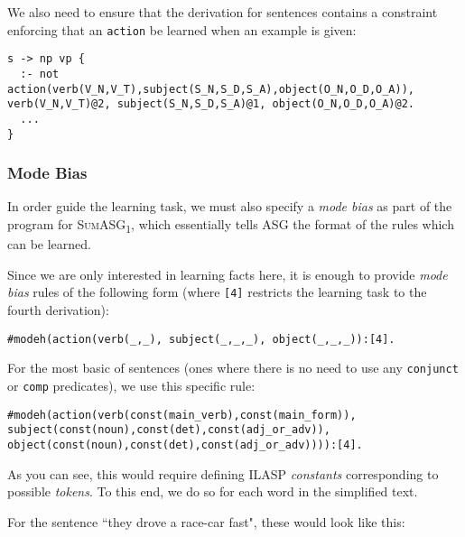 We also need to ensure that the derivation for sentences contains a constraint enforcing that an \texttt{action} be learned when an example is given:

\begin{displayquote}
\begin{lstlisting}[numbers=none]
s -> np vp {
  :- not action(verb(V_N,V_T),subject(S_N,S_D,S_A),object(O_N,O_D,O_A)), verb(V_N,V_T)@2, subject(S_N,S_D,S_A)@1, object(O_N,O_D,O_A)@2.
  ...
}
\end{lstlisting}
\end{displayquote}

\subsubsection{Mode Bias}

In order guide the learning task, we must also specify a \textit{mode bias} as part of the program for \textsc{SumASG\textsubscript{1}}, which essentially tells ASG the format of the rules which can be learned.

Since we are only interested in learning facts here, it is enough to provide \textit{mode bias} rules of the following form (where \texttt{[4]} restricts the learning task to the fourth derivation):

\begin{displayquote}
\begin{lstlisting}[numbers=none]
#modeh(action(verb(_,_), subject(_,_,_), object(_,_,_)):[4].
\end{lstlisting}
\end{displayquote}

For the most basic of sentences (ones where there is no need to use any \texttt{conjunct} or \texttt{comp} predicates), we use this specific rule:

\begin{displayquote}
\begin{lstlisting}[numbers=none]
#modeh(action(verb(const(main_verb),const(main_form)), subject(const(noun),const(det),const(adj_or_adv)), object(const(noun),const(det),const(adj_or_adv)))):[4].
\end{lstlisting}
\end{displayquote}

As you can see, this would require defining ILASP \textit{constants} corresponding to possible \textit{tokens}. To this end, we do so for each word in the simplified text.

For the sentence ``they drove a race-car fast", these would look like this:

